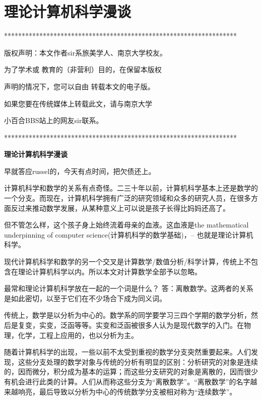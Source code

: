 \chapter{理论计算机科学漫谈}


******************************************************************
  
版权声明：本文作者sir系旅美学人、南京大学校友。 

为了学术或 教育的（非营利）目的，在保留本版权

声明的情况下，您可以自由 转载本文的电子版。

如果您要在传统媒体上转载此文，请与南京大学

小百合BBS站上的网友sir联系。 

****************************************************************** 




\begin{center}\textbf{理论计算机科学漫谈}\end{center}




早就答应russel的，今天有点时间，把欠债还上。 

计算机科学和数学的关系有点奇怪。二三十年以前，计算机科学基本上还是数学的一个分支。而现在，计算机科学拥有广泛的研究领域和众多的研究人员，在很多方面反过来推动数学发展，从某种意义上可以说是孩子长得比妈妈还高了。 

但不管怎么样，这个孩子身上始终流着母亲的血液。这血液是the mathematical underpinning of computer science(计算机科学的数学基础)，-- 也就是理论计算机科学。 

现代计算机科学和数学的另一个交叉是计算数学/数值分析/科学计算，传统上不包含在理论计算机科学以内。所以本文对计算数学全部予以忽略。 

最常和理论计算机科学放在一起的一个词是什么？ 答：离散数学。这两者的关系是如此密切，以至于它们在不少场合下成为同义词。 

传统上，数学是以分析为中心的。数学系的同学要学习三四个学期的数学分析，然后是复变，实变，泛函等等。实变和泛函被很多人认为是现代数学的入门。在物理，化学，工程上应用的，也以分析为主。 

随着计算机科学的出现，一些以前不太受到重视的数学分支突然重要起来。人们发现，这些分支处理的数学对象与传统的分析有明显的区别：分析研究的对象是连续的，因而微分，积分成为基本的运算；而这些分支研究的对象是离散的，因而很少有机会进行此类的计算。人们从而称这些分支为“离散数学”。“离散数学”的名字越来越响亮，最后导致以分析为中心的传统数学分支被相对称为“连续数学”。 


